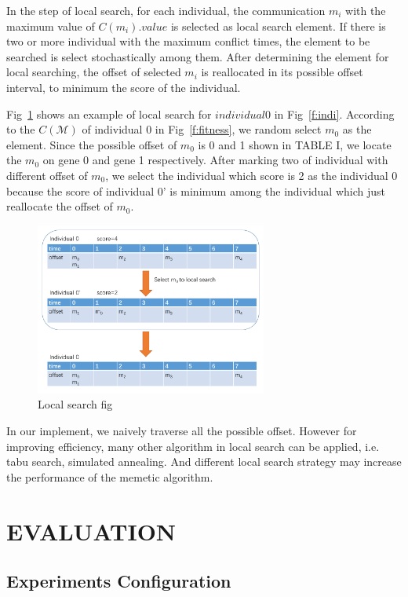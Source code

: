 \documentclass[journal]{IEEEtran}
\begin{document}
In the step of local search, for each individual, the communication $m_i$ with the maximum value of $C(m_i).value$ is selected as local search element. If there is two or more individual with the maximum conflict times, the element to be searched is select stochastically among them. After determining the element for local searching, the offset of selected $m_i$ is reallocated in its possible offset interval, to minimum the score of the individual.

Fig~\ref{f:local} shows an example of local search for $individual 0$ in Fig~\ref{f:indi}. According to the $C(\mathcal{M})$ of individual 0 in Fig~\ref{f:fitness}, we random select $m_0$ as the element. Since the possible offset of $m_0$ is 0 and 1 shown in TABLE I, we locate the $m_0$ on gene 0 and gene 1 respectively. After marking two of individual with different offset of $m_0$, we select the individual which score is 2 as the individual 0 because the score of individual 0' is minimum among the individual which just reallocate the offset of $m_0$.
\begin{figure}[!t]
	\centering
	\includegraphics[width=3in]{picture/local.pdf}
	\caption{Local search fig}
	\label{f:local}
\end{figure}

In our implement, we naively traverse all the possible offset. However for improving efficiency, many other algorithm in local search can be applied, i.e. tabu search, simulated annealing. And different local search strategy may increase the performance of the memetic algorithm.

\section{EVALUATION\label{s:evalu}}

\subsection{Experiments Configuration}
\end{document}
